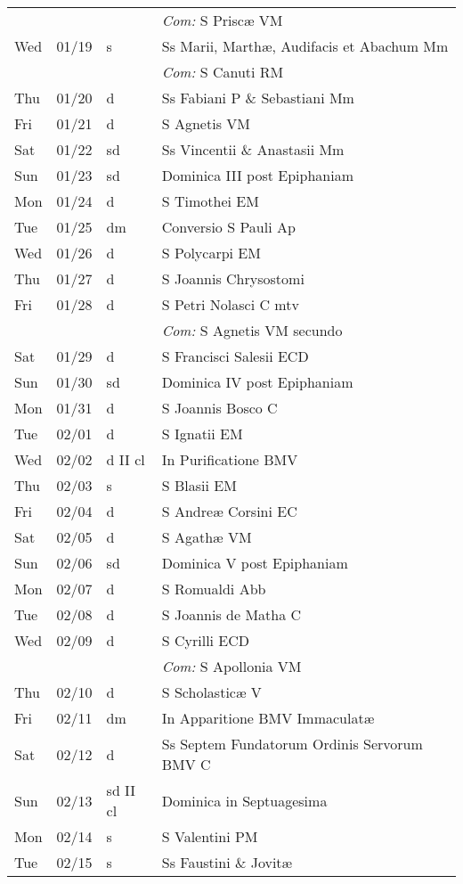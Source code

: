 \documentclass[10pt]{article}
\begin{document}
\begin{longtable}{ l l l l }
 & & & \textit{Com:} S Priscæ VM\\
Wed & 01/19 & s & Ss Marii, Marthæ, Audifacis et Abachum Mm\\
 & & & \textit{Com:} S Canuti RM\\
Thu & 01/20 & d & Ss Fabiani P \& Sebastiani Mm\\
Fri & 01/21 & d & S Agnetis VM\\
Sat & 01/22 & sd & Ss Vincentii \& Anastasii Mm\\
Sun & 01/23 & sd & Dominica III post Epiphaniam\\
Mon & 01/24 & d & S Timothei EM\\
Tue & 01/25 & dm & Conversio S Pauli Ap\\
Wed & 01/26 & d & S Polycarpi EM\\
Thu & 01/27 & d & S Joannis Chrysostomi\\
Fri & 01/28 & d & S Petri Nolasci C mtv\\
 & & & \textit{Com:} S Agnetis VM secundo\\
Sat & 01/29 & d & S Francisci Salesii ECD\\
Sun & 01/30 & sd & Dominica IV post Epiphaniam\\
Mon & 01/31 & d & S Joannis Bosco C\\
Tue & 02/01 & d & S Ignatii EM\\
Wed & 02/02 & d II cl & In Purificatione BMV\\
Thu & 02/03 & s & S Blasii EM\\
Fri & 02/04 & d & S Andreæ Corsini EC\\
Sat & 02/05 & d & S Agathæ VM\\
Sun & 02/06 & sd & Dominica V post Epiphaniam\\
Mon & 02/07 & d & S Romualdi Abb\\
Tue & 02/08 & d & S Joannis de Matha C\\
Wed & 02/09 & d & S Cyrilli ECD\\
 & & & \textit{Com:} S Apollonia VM\\
Thu & 02/10 & d & S Scholasticæ V\\
Fri & 02/11 & dm & In Apparitione BMV Immaculatæ\\
Sat & 02/12 & d & Ss Septem Fundatorum Ordinis Servorum BMV C\\
Sun & 02/13 & sd II cl & Dominica in Septuagesima\\
Mon & 02/14 & s & S Valentini PM\\
Tue & 02/15 & s & Ss Faustini \& Jovitæ\\

\end{longtable}
\end{document}
